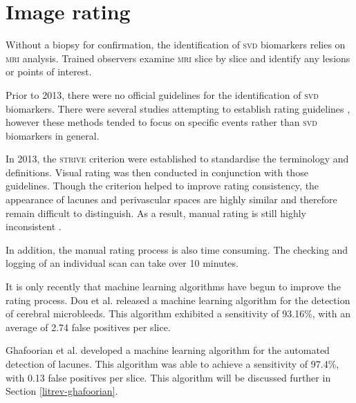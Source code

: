 \section{Image rating}\label{svd-rating}

Without a biopsy for confirmation, the identification of \textsc{svd} biomarkers relies on \textsc{mri} analysis. Trained observers examine \textsc{mri} slice by slice and identify any lesions or points of interest.

Prior to 2013, there were no official guidelines for the identification of \textsc{svd} biomarkers. There were several studies attempting to establish rating guidelines \cite{AdamsH.H.Hieab2013RMfD, PotterGillian2015CPSV}, however these methods tended to focus on specific events rather than \textsc{svd} biomarkers in general.


In 2013, the \textsc{strive} criterion \cite{WardlawJ.M.2013Nsfr} were established to standardise the terminology and definitions. Visual rating was then conducted in conjunction with those guidelines. Though the criterion helped to improve rating consistency, the appearance of lacunes and perivascular spaces are highly similar and therefore remain difficult to distinguish. As a result, manual rating is still highly inconsistent \cite{PotterGillian2015CPSV}. 

In addition, the manual rating process is also time consuming. The checking and logging of an individual scan can take over 10 minutes.

It is only recently that machine learning algorithms have begun to improve the rating process. Dou et al. \cite{DouQ.2016ADoC} released a machine learning algorithm for the detection of cerebral microbleeds. This algorithm exhibited a sensitivity of 93.16\%, with an average of 2.74 false positives per slice. 


Ghafoorian et al. \cite{GhafoorianM.2017Dml3} developed a machine learning algorithm for the automated detection of lacunes. This algorithm was able to achieve a sensitivity of 97.4\%, with 0.13 false positives per slice. This algorithm will be discussed further in Section \ref{litrev-ghafoorian}.


%
